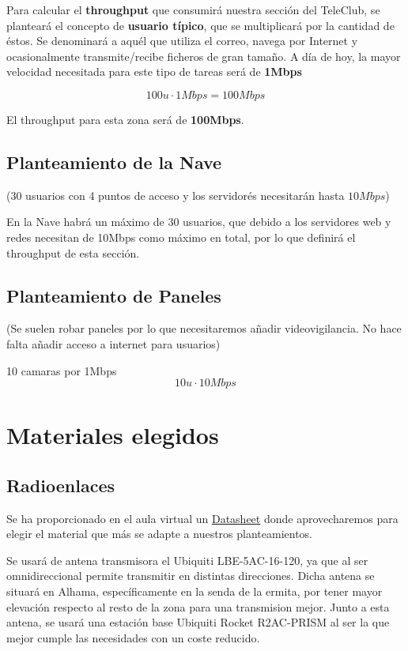 \documentclass{article}
\begin{document}
Para calcular el \textbf{throughput} que consumirá nuestra sección del TeleClub, se planteará el concepto de \textbf{usuario típico}, que se multiplicará por la cantidad de éstos. Se denominará a aquél que utiliza el correo, navega por Internet y ocasionalmente transmite/recibe ficheros de gran tamaño. A día de hoy, la mayor velocidad necesitada para este tipo de tareas será de \textbf{1Mbps}

    $$100u \cdot 1Mbps = 100Mbps$$

El throughput para esta zona será de \textbf{100Mbps}.

\subsection{Planteamiento de la Nave}

(30 usuarios con 4 puntos de acceso y los servidorés necesitarán hasta $10Mbps$)

En la Nave habrá un máximo de 30 usuarios, que debido a los servidores web y redes necesitan de 10Mbps como máximo en total, por lo que definirá el throughput de esta sección.

\subsection{Planteamiento de Paneles}

(Se suelen robar paneles por lo que necesitaremos añadir videovigilancia. No hace falta añadir acceso a internet para usuarios)

10 camaras por 1Mbps
$$10u \cdot 10Mbps$$

\section{Materiales elegidos}

\subsection{Radioenlaces}

Se ha proporcionado en el aula virtual un \href{http://www.microcom.com.ar/fotos/ficha7097LBE-M5-23.compressed.pdf}{Datasheet} donde aprovecharemos para elegir el material que más se adapte a nuestros planteamientos. 

\quad

Se usará de antena transmisora el Ubiquiti LBE-5AC-16-120, ya que al ser omnidireccional permite transmitir en distintas direcciones. Dicha antena se situará en Alhama, específicamente en la senda de la ermita, por tener mayor elevación respecto al resto de la zona para una transmision mejor. Junto a esta antena, se usará una estación base Ubiquiti Rocket R2AC-PRISM al ser la que mejor cumple las necesidades con un coste reducido.
\end{document}
